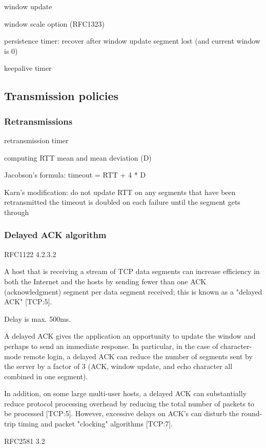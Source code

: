 window update

window scale option (RFC1323)

persistence timer: recover after window update segment lost (and current window is 0)

keepalive timer

\subsection{Transmission policies}

\subsubsection*{Retransmissions}

retransmission timer

computing RTT mean and mean deviation (D)

Jacobson's formula: timeout = RTT + 4 * D

Karn's modification: do not update RTT on any segments that have been retransmitted
                     the timeout is doubled on each failure until the segment gets through

\subsubsection*{Delayed ACK algorithm}

RFC1122 4.2.3.2

A host that is receiving a stream of TCP data segments can
increase efficiency in both the Internet and the hosts by
sending fewer than one ACK (acknowledgment) segment per data
segment received; this is known as a "delayed ACK" [TCP:5].

Delay is max. 500ms.

A delayed ACK gives the application an opportunity to
update the window and perhaps to send an immediate
response.  In particular, in the case of character-mode
remote login, a delayed ACK can reduce the number of
segments sent by the server by a factor of 3 (ACK,
window update, and echo character all combined in one
segment).

In addition, on some large multi-user hosts, a delayed
ACK can substantially reduce protocol processing
overhead by reducing the total number of packets to be
processed [TCP:5].  However, excessive delays on ACK's
can disturb the round-trip timing and packet "clocking"
algorithms [TCP:7].

RFC2581 3.2

